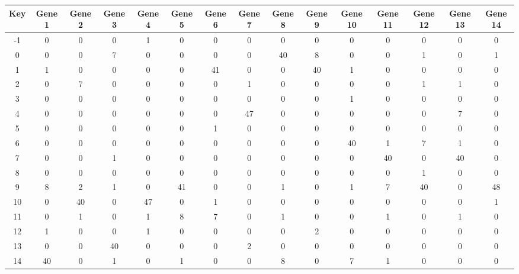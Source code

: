 \begin{tabular}{|c|c|c|c|c|c|c|c|c|c|c|c|c|c|c|}
\hline
Key & Gene 1 & Gene 2 & Gene 3 & Gene 4 & Gene 5 & Gene 6 & Gene 7 & Gene 8 & Gene 9 & Gene 10 & Gene 11 & Gene 12 & Gene 13 & Gene 14 \\
\hline
-1 & 0 & 0 & 0 & 1 & 0 & 0 & 0 & 0 & 0 & 0 & 0 & 0 & 0 & 0 \\
0 & 0 & 0 & 7 & 0 & 0 & 0 & 0 & 40 & 8 & 0 & 0 & 1 & 0 & 1 \\
1 & 1 & 0 & 0 & 0 & 0 & 41 & 0 & 0 & 40 & 1 & 0 & 0 & 0 & 0 \\
2 & 0 & 7 & 0 & 0 & 0 & 0 & 1 & 0 & 0 & 0 & 0 & 1 & 1 & 0 \\
3 & 0 & 0 & 0 & 0 & 0 & 0 & 0 & 0 & 0 & 1 & 0 & 0 & 0 & 0 \\
4 & 0 & 0 & 0 & 0 & 0 & 0 & 47 & 0 & 0 & 0 & 0 & 0 & 7 & 0 \\
5 & 0 & 0 & 0 & 0 & 0 & 1 & 0 & 0 & 0 & 0 & 0 & 0 & 0 & 0 \\
6 & 0 & 0 & 0 & 0 & 0 & 0 & 0 & 0 & 0 & 40 & 1 & 7 & 1 & 0 \\
7 & 0 & 0 & 1 & 0 & 0 & 0 & 0 & 0 & 0 & 0 & 40 & 0 & 40 & 0 \\
8 & 0 & 0 & 0 & 0 & 0 & 0 & 0 & 0 & 0 & 0 & 0 & 1 & 0 & 0 \\
9 & 8 & 2 & 1 & 0 & 41 & 0 & 0 & 1 & 0 & 1 & 7 & 40 & 0 & 48 \\
10 & 0 & 40 & 0 & 47 & 0 & 1 & 0 & 0 & 0 & 0 & 0 & 0 & 0 & 1 \\
11 & 0 & 1 & 0 & 1 & 8 & 7 & 0 & 1 & 0 & 0 & 1 & 0 & 1 & 0 \\
12 & 1 & 0 & 0 & 1 & 0 & 0 & 0 & 0 & 2 & 0 & 0 & 0 & 0 & 0 \\
13 & 0 & 0 & 40 & 0 & 0 & 0 & 2 & 0 & 0 & 0 & 0 & 0 & 0 & 0 \\
14 & 40 & 0 & 1 & 0 & 1 & 0 & 0 & 8 & 0 & 7 & 1 & 0 & 0 & 0 \\
\hline
\end{tabular}